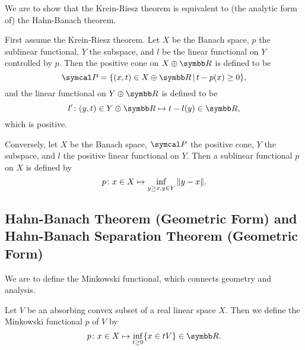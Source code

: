 \begin{remark}
  We are to show that the Krein-Riesz theorem is equivalent to (the analytic form of) the Hahn-Banach theorem.

  First assume the Krein-Riesz theorem. Let $X$ be the Banach space, $p$ the sublinear functional, $Y$ the subspace, and $l$ be the linear functional on $Y$ controlled by $p$. Then the positive cone on $X\oplus \RR$ is defined to be
  \begin{equation*}
    \CONE P=\{(x,t)\in X\oplus \RR\VERT t-p(x)\geq 0\},
  \end{equation*}
  and the linear functional on $Y\oplus \RR$ is defined to be
  \begin{equation*}
    l'\colon (y, t)\in Y\oplus \RR\mapsto t-l(y)\in\RR,
  \end{equation*}
  which is positive.

  Conversely, let $X$ be the Banach space, $\CONE P$ the positive cone, $Y$ the subspace, and $l$ the positive linear functional on $Y$. Then a sublinear functional $p$ on $X$ is defined by
  \begin{equation*}
    p\colon x\in X\mapsto \inf_{y\geq x, y\in Y}\Vert y-x\Vert.
  \end{equation*}
\end{remark}

\subsection{Hahn-Banach Theorem (Geometric Form) and Hahn-Banach Separation Theorem (Geometric Form)}

We are to define the Minkowski functional, which connects geometry and analysis.

\begin{definition}
  Let $V$ be an absorbing convex subset of a real linear space $X$. Then we define the Minkowski functional $p$ of $V$ by
  \begin{equation*}
    p\colon x\in X\mapsto \inf_{t\geq 0}\{x\in tV\}\in\RR.
  \end{equation*}
\end{definition}

